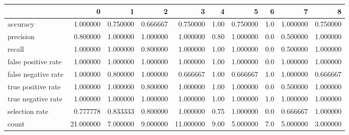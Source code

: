 \begin{tabular}{lrrrrrrrrr}
\toprule
{} &          0 &         1 &         2 &          3 &     4 &         5 &    6 &         7 &         8 \\
\midrule
accuracy            &   1.000000 &  0.750000 &  0.666667 &   0.750000 &  1.00 &  0.750000 &  1.0 &  1.000000 &  0.750000 \\
precision           &   0.800000 &  1.000000 &  1.000000 &   1.000000 &  0.80 &  1.000000 &  0.0 &  0.500000 &  1.000000 \\
recall              &   1.000000 &  1.000000 &  0.800000 &   1.000000 &  1.00 &  1.000000 &  0.0 &  0.500000 &  1.000000 \\
false positive rate &   1.000000 &  1.000000 &  1.000000 &   1.000000 &  1.00 &  1.000000 &  0.0 &  1.000000 &  1.000000 \\
false negative rate &   1.000000 &  0.800000 &  1.000000 &   0.666667 &  1.00 &  0.666667 &  1.0 &  1.000000 &  0.666667 \\
true positive rate  &   1.000000 &  1.000000 &  0.800000 &   1.000000 &  1.00 &  1.000000 &  0.0 &  0.500000 &  1.000000 \\
true negative rate  &   1.000000 &  1.000000 &  1.000000 &   1.000000 &  1.00 &  1.000000 &  1.0 &  1.000000 &  1.000000 \\
selection rate      &   0.777778 &  0.833333 &  0.800000 &   1.000000 &  0.75 &  1.000000 &  0.0 &  0.666667 &  1.000000 \\
count               &  21.000000 &  7.000000 &  9.000000 &  11.000000 &  9.00 &  5.000000 &  7.0 &  5.000000 &  3.000000 \\
\bottomrule
\end{tabular}
